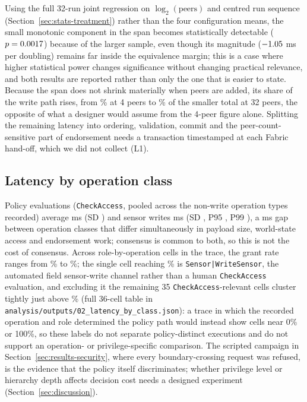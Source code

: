 Using the full 32-run joint regression on $\log_2(\text{peers})$ and centred run sequence (Section~\ref{sec:stats-treatment}) rather than the four configuration means, the small monotonic component in the span becomes statistically detectable ($p=0.0017$) because of the larger sample, even though its magnitude ($-1.05$ ms per doubling) remains far inside the equivalence margin; this is a case where higher statistical power changes significance without changing practical relevance, and both results are reported rather than only the one that is easier to state. Because the span does not shrink materially when peers are added, its share of the write path rises, from \SpanSharePeerFour\% at 4 peers to \SpanSharePeerThirtyTwo\% of the smaller total at 32 peers, the opposite of what a designer would assume from the 4-peer figure alone. Splitting the remaining latency into ordering, validation, commit and the peer-count-sensitive part of endorsement needs a transaction timestamped at each Fabric hand-off, which we did not collect (L1).

\subsection{Latency by operation class}
\label{sec:latency-by-op}

Policy evaluations (\texttt{CheckAccess}, pooled across the non-write operation types recorded) average \CheckAccessMeanMs{} ms (SD \CheckAccessSdMs) and sensor writes \SensorWriteMeanMs{} ms (SD \SensorWriteSdMs, P95 \SensorWritePNinetyFiveMs, P99 \SensorWritePNinetyNineMs), a \LatencyGapMs{} ms gap between operation classes that differ simultaneously in payload size, world-state access and endorsement work; consensus is common to both, so this is not the cost of consensus. Across \RoleOpCells{} role-by-operation cells in the trace, the grant rate ranges from \GrantRateMin\% to \GrantRateMax\%; the single cell reaching \GrantRateMax\% is \texttt{Sensor|WriteSensor}, the automated field sensor-write channel rather than a human \texttt{CheckAccess} evaluation, and excluding it the remaining 35 \texttt{CheckAccess}-relevant cells cluster tightly just above \GrantRateMin\% (full 36-cell table in \texttt{analysis/outputs/02\_latency\_by\_class.json}): a trace in which the recorded operation and role determined the policy path would instead show cells near 0\% or 100\%, so these labels do not separate policy-distinct executions and do not support an operation- or privilege-specific comparison. The scripted campaign in Section~\ref{sec:results-security}, where every boundary-crossing request was refused, is the evidence that the policy itself discriminates; whether privilege level or hierarchy depth affects decision cost needs a designed experiment (Section~\ref{sec:discussion}).

